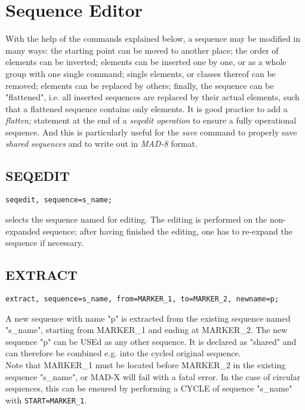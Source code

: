
\chapter{Sequence Editor}
\label{chap:seqedit}
With the help of the commands explained below, a sequence may be
modified in many ways: the starting point can be moved to another place;
the order of elements can be inverted; elements can be inserted one by
one, or as a whole group with one single command; single elements, or
classes thereof can be removed; elements can be replaced by others;
finally, the sequence can be "flattened", i.e. all inserted sequences
are replaced by their actual elements, such that a flattened sequence
contains only elements. It is good practice to add a \textit{ flatten; }
statement at the end of a \textit{ seqedit operation } to ensure a fully
operational sequence. And this is particularly useful for the \textit{
  save } command to properly save \textit{ shared sequences } and to
write out in \textit{ MAD-8 } format.  


\section{SEQEDIT}
\label{sec:seqedit}
\begin{verbatim}
seqedit, sequence=s_name;
\end{verbatim} 
selects the sequence named for editing. The editing is performed on the
non-expanded sequence; after having finished the editing, one has to
re-expand the sequence if necessary.  

\section{EXTRACT}
\label{sec:extract}
\begin{verbatim}
extract, sequence=s_name, from=MARKER_1, to=MARKER_2, newname=p;
\end{verbatim} 
A new sequence with name "p" is extracted from the existing sequence named "s\_name", 
starting from MARKER\_1 and ending at MARKER\_2. The new sequence
"p" can be USEd as any other sequence. It is declared as "shared" and
can therefore be combined e.g. into the cycled original sequence. \\ 
Note that MARKER\_1 must be located before MARKER\_2 in the existing sequence "s\_name", 
or MAD-X will fail with a fatal error. 
In the case of circular sequences, this can be ensured by performing a CYCLE 
of sequence "s\_name" with {\tt START=MARKER\_1}.


